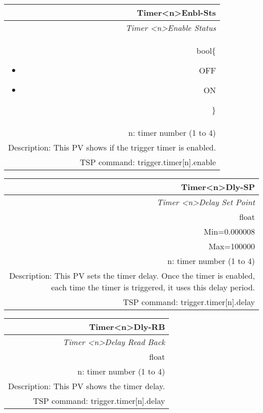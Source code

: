 \documentclass[openany]{article}
\begin{document}
		\begin{tabular}{N}
			\hline
			\bfseries Timer{\textless n\textgreater}Enbl-Sts\label{pv:timerenbl-sts} \\ \hline
			\emph{Timer \textless n\textgreater Enable Status} \\
			bool\{\begin{itemize}[noitemsep]
				\small
				\item[] OFF
				\item[] ON
			\end{itemize}\} \\
			n: timer number (1 to 4) \\
			Description: This PV shows if the trigger timer is enabled. \\
			TSP command: trigger.timer[n].enable
		\end{tabular}

		\begin{tabular}{N}
			\hline
			\bfseries Timer{\textless n\textgreater}Dly-SP\label{pv:timerdly-sp} \\ \hline
			\emph{Timer \textless n\textgreater Delay Set Point} \\
			float \\
			Min=0.000008 \\
			Max=100000 \\
			n: timer number (1 to 4) \\
			Description: This PV sets the timer delay. Once the timer is enabled, each time the timer is triggered, it uses this delay period. \\
			TSP command: trigger.timer[n].delay
		\end{tabular}

		\begin{tabular}{N}
			\hline
			\bfseries Timer{\textless n\textgreater}Dly-RB\label{pv:timerdly-rb} \\ \hline
			\emph{Timer \textless n\textgreater Delay Read Back} \\
			float \\
			n: timer number (1 to 4) \\
			Description: This PV shows the timer delay. \\
			TSP command: trigger.timer[n].delay
		\end{tabular}
\end{document}
